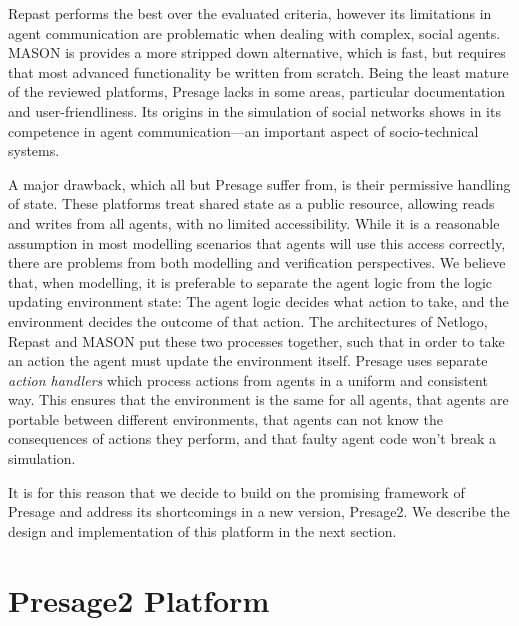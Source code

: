 Repast performs the best over the evaluated criteria, however its limitations in agent communication are problematic when dealing with complex, social agents. MASON is provides a more stripped down alternative, which is fast, but requires that most advanced functionality be written from scratch. Being the least mature of the reviewed platforms, Presage lacks in some areas, particular documentation and user-friendliness. Its origins in the simulation of social networks shows in its competence in agent communication---an important aspect of socio-technical systems. 

A major drawback, which all but Presage suffer from, is their permissive handling of state. These platforms treat shared state as a public resource, allowing reads and writes from all agents, with no limited accessibility. While it is a reasonable assumption in most modelling scenarios that agents will use this access correctly, there are problems from both modelling and verification perspectives. We believe that, when modelling, it is preferable to separate the agent logic from the logic updating environment state: The agent logic decides what action to take, and the environment decides the outcome of that action. The architectures of Netlogo, Repast and MASON put these two processes together, such that in order to take an action the agent must update the environment itself. Presage uses separate \emph{action handlers} which process actions from agents in a uniform and consistent way. This ensures that the environment is the same for all agents, that agents are portable between different environments, that agents can not know the consequences of actions they perform, and that faulty agent code won't break a simulation.

It is for this reason that we decide to build on the promising  framework of Presage and address its shortcomings in a new version, Presage2. We describe the design and implementation of this platform in the next section.




\section{Presage2 Platform}

